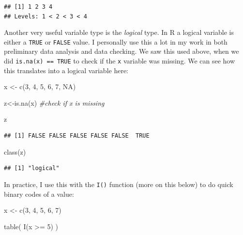 \documentclass[
]{book}
\newenvironment{Shaded}{\begin{snugshade}}{\end{snugshade}}
\newcommand{\CommentTok}[1]{\textcolor[rgb]{0.56,0.35,0.01}{\textit{#1}}}
\newcommand{\ConstantTok}[1]{\textcolor[rgb]{0.00,0.00,0.00}{#1}}
\newcommand{\DecValTok}[1]{\textcolor[rgb]{0.00,0.00,0.81}{#1}}
\newcommand{\FunctionTok}[1]{\textcolor[rgb]{0.00,0.00,0.00}{#1}}
\newcommand{\NormalTok}[1]{#1}
\newcommand{\OtherTok}[1]{\textcolor[rgb]{0.56,0.35,0.01}{#1}}
\newcommand{\SpecialCharTok}[1]{\textcolor[rgb]{0.00,0.00,0.00}{#1}}
\begin{document}
\begin{verbatim}
## [1] 1 2 3 4
## Levels: 1 < 2 < 3 < 4
\end{verbatim}

Another very useful variable type is the \emph{logical} type. In R a logical
variable is either a \texttt{TRUE} or \texttt{FALSE} value. I personally use this a
lot in my work in both preliminary data analysis and data checking. We
saw this used above, when we did \texttt{is.na(x)\ ==\ TRUE} to check if the \texttt{x}
variable was missing. We can see how this translates into a logical
variable here:

\begin{Shaded}
\begin{Highlighting}[]
\NormalTok{x }\OtherTok{\textless{}{-}} \FunctionTok{c}\NormalTok{(}\DecValTok{3}\NormalTok{, }\DecValTok{4}\NormalTok{, }\DecValTok{5}\NormalTok{, }\DecValTok{6}\NormalTok{, }\DecValTok{7}\NormalTok{, }\ConstantTok{NA}\NormalTok{)}

\NormalTok{z}\OtherTok{\textless{}{-}}\FunctionTok{is.na}\NormalTok{(x) }\CommentTok{\#check if x is missing}

\NormalTok{z}
\end{Highlighting}
\end{Shaded}

\begin{verbatim}
## [1] FALSE FALSE FALSE FALSE FALSE  TRUE
\end{verbatim}

\begin{Shaded}
\begin{Highlighting}[]
\FunctionTok{class}\NormalTok{(z)}
\end{Highlighting}
\end{Shaded}

\begin{verbatim}
## [1] "logical"
\end{verbatim}

In practice, I use this with the \texttt{I()} function (more on this below) to
do quick binary codes of a value:

\begin{Shaded}
\begin{Highlighting}[]
\NormalTok{x }\OtherTok{\textless{}{-}} \FunctionTok{c}\NormalTok{(}\DecValTok{3}\NormalTok{, }\DecValTok{4}\NormalTok{, }\DecValTok{5}\NormalTok{, }\DecValTok{6}\NormalTok{, }\DecValTok{7}\NormalTok{)}

\FunctionTok{table}\NormalTok{( }\FunctionTok{I}\NormalTok{(x }\SpecialCharTok{\textgreater{}=} \DecValTok{5}\NormalTok{) )}
\end{Highlighting}
\end{Shaded}
\end{document}
